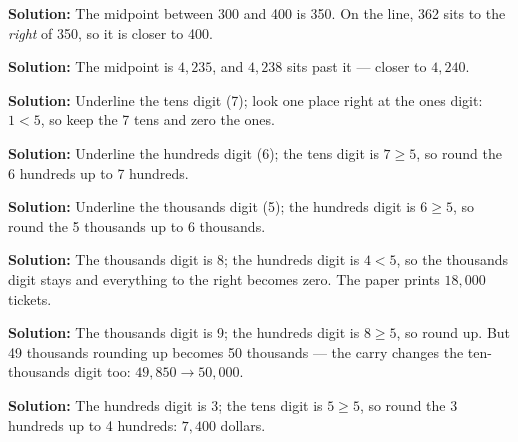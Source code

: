 \documentclass[12pt]{article}
\begin{document}



\textbf{Solution:} The midpoint between 300 and 400 is 350. On the line, 362
sits to the \emph{right} of 350, so it is closer to 400. 


\textbf{Solution:} The midpoint is $4{,}235$, and $4{,}238$ sits past it —
closer to $4{,}240$. 


\textbf{Solution:} Underline the tens digit (7); look one place right at the
ones digit: $1 < 5$, so keep the 7 tens and zero the ones. 


\textbf{Solution:} Underline the hundreds digit (6); the tens digit is
$7 \geq 5$, so round the 6 hundreds up to 7 hundreds. 


\textbf{Solution:} Underline the thousands digit (5); the hundreds digit is
$6 \geq 5$, so round the 5 thousands up to 6 thousands. 


\textbf{Solution:} The thousands digit is 8; the hundreds digit is $4 < 5$, so
the thousands digit stays and everything to the right becomes zero. The paper
prints $18{,}000$ tickets. 


\textbf{Solution:} The thousands digit is 9; the hundreds digit is $8 \geq 5$,
so round up. But 49 thousands rounding up becomes 50 thousands — the carry
changes the ten-thousands digit too: $49{,}850 \rightarrow 50{,}000$.


\textbf{Solution:} The hundreds digit is 3; the tens digit is $5 \geq 5$, so
round the 3 hundreds up to 4 hundreds: $7{,}400$ dollars. 

\end{document}
